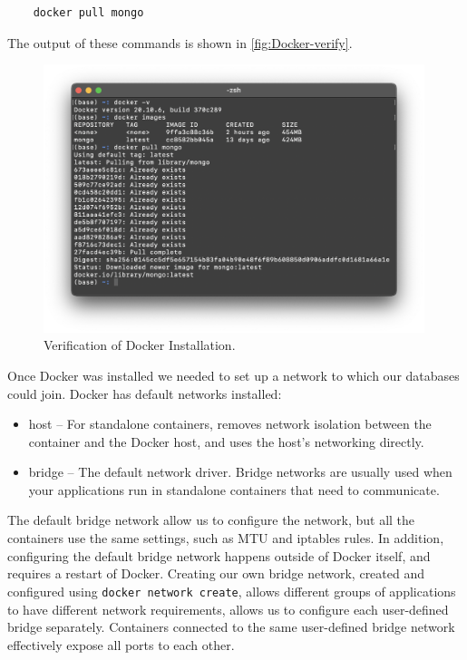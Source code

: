 \documentclass{article}
\begin{document}
\begin{tcolorbox}[colback=CrispBlue!5!white,colframe=CrispBlue!75!black,title=Pulls latest version of MongoDB from Docker Hub]
    \begin{verbatim}    
    docker pull mongo
\end{verbatim}
\end{tcolorbox}
The output of these commands is shown in \autoref{fig:Docker-verify}.

\begin{figure}[ht]
    \centering
    \includegraphics[width=0.99\textwidth]{Docker-verify.png}
    \vspace{-3em}\caption{Verification of Docker Installation.}
    \label{fig:Docker-verify}
\end{figure}

\newpage
Once Docker was installed we needed to set up a network to which our databases could join. Docker has default networks installed:
\begin{itemize}
    \item host -- For standalone containers, removes network isolation between the container and the Docker host, and uses the host’s networking directly.
    \item bridge -- The default network driver. Bridge networks are usually used when your applications run in standalone containers that need to communicate.
\end{itemize}

The default bridge network allow us to configure the network, but all the containers use the same settings, such as MTU and iptables rules. In addition, configuring the default bridge network happens outside of Docker itself, and requires a restart of Docker. Creating our own bridge network, created and configured using \texttt{docker network create}, allows different groups of applications to have different network requirements, allows us to configure each user-defined bridge separately. Containers connected to the same user-defined bridge network effectively expose all ports to each other.
\end{document}
